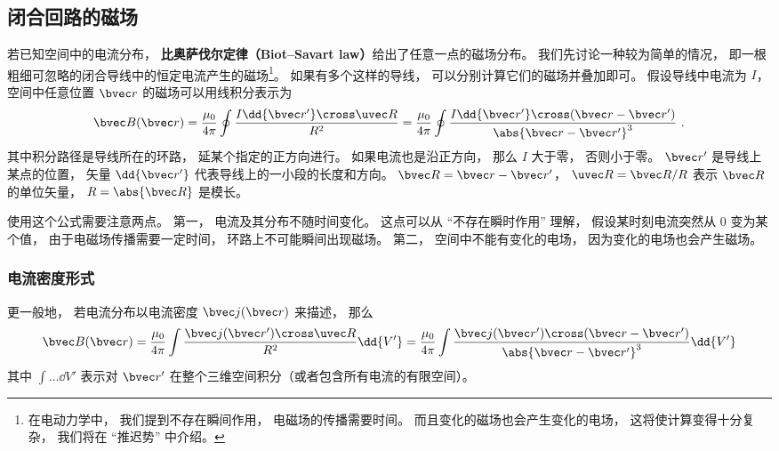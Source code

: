 
\subsection{闭合回路的磁场}
若已知空间中的电流分布， \textbf{比奥萨伐尔定律（Biot–Savart law）}给出了任意一点的磁场分布。 我们先讨论一种较为简单的情况， 即一根粗细可忽略的闭合导线中的恒定电流产生的磁场\footnote{在电动力学中， 我们提到不存在瞬间作用， 电磁场的传播需要时间。 而且变化的磁场也会产生变化的电场， 这将使计算变得十分复杂， 我们将在 “推迟势” 中介绍。}。 如果有多个这样的导线， 可以分别计算它们的磁场并叠加即可。 假设导线中电流为 $I$， 空间中任意位置 $\bvec r$ 的磁场可以用线积分表示为
\begin{equation}\label{BioSav_eq2}
\bvec B(\bvec r) = \frac{\mu_0}{4\pi} \oint \frac{I \dd{\bvec r'} \cross \uvec R}{R^2}
= \frac{\mu_0}{4\pi} \oint \frac{I \dd{\bvec r'} \cross (\bvec r - \bvec r')}{\abs{\bvec r - \bvec r'}^3}~.
\end{equation}
其中积分路径是导线所在的环路， 延某个指定的正方向进行。 如果电流也是沿正方向， 那么 $I$ 大于零， 否则小于零。 $\bvec r'$ 是导线上某点的位置， 矢量 $\dd{\bvec r'}$ 代表导线上的一小段的长度和方向。 $\bvec R = \bvec r - \bvec r'$， $\uvec R = \bvec R/R$ 表示 $\bvec R$ 的单位矢量， $R = \abs{\bvec R}$ 是模长。

使用这个公式需要注意两点。 第一， 电流及其分布不随时间变化。 这点可以从 “不存在瞬时作用” 理解， 假设某时刻电流突然从 0 变为某个值， 由于电磁场传播需要一定时间， 环路上不可能瞬间出现磁场。 第二， 空间中不能有变化的电场， 因为变化的电场也会产生磁场。%

\subsubsection{电流密度形式}
更一般地， 若电流分布以电流密度 $\bvec j(\bvec r)$ 来描述， 那么
\begin{equation}\label{BioSav_eq3}
\bvec B(\bvec r) = \frac{\mu_0}{4\pi} \int \frac{\bvec j(\bvec r') \cross \uvec R}{R^2} \dd{V'} = \frac{\mu_0}{4\pi} \int \frac{\bvec j(\bvec r') \cross (\bvec r - \bvec r')}{\abs{\bvec r - \bvec r'}^3} \dd{V'}
\end{equation}
其中 $\int \dots \dd{V'}$ 表示对 $\bvec r'$ 在整个三维空间积分（或者包含所有电流的有限空间）。

